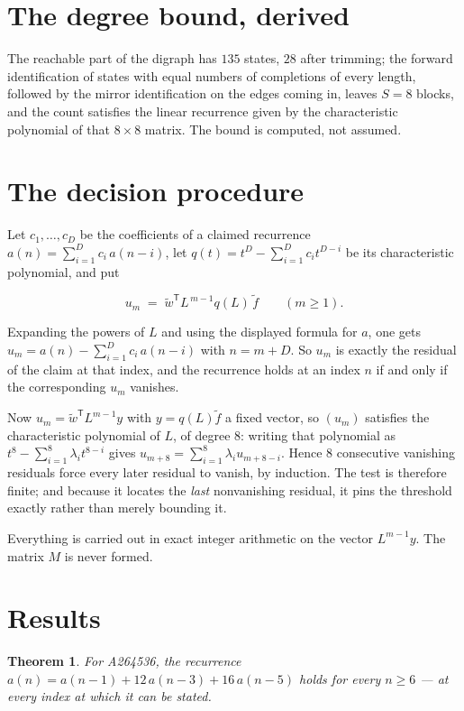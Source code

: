 \documentclass[11pt]{article}
\newtheorem{theorem}{Theorem}
\theoremstyle{definition}
\begin{document}
\section{The degree bound, derived}

The reachable part of the digraph has $135$ states, $28$ after trimming; the forward identification of states with equal numbers of completions of every length, followed by the mirror identification on the edges coming in, leaves $S = 8$ blocks, and the count satisfies the linear recurrence given by the characteristic polynomial of that $8\times8$ matrix. The bound is computed, not assumed.

\section{The decision procedure}

Let $c_1,\dots,c_D$ be the coefficients of a claimed recurrence $a(n) = \sum_{i=1}^{D} c_i\,a(n-i)$, let $q(t) = t^{D} - \sum_{i=1}^{D} c_i t^{D-i}$ be its characteristic polynomial, and put

\[u_m \;=\; \tilde w^{\mathsf T} L^{\,m-1} q(L)\,\tilde f \qquad (m \ge 1).\]

Expanding the powers of $L$ and using the displayed formula for $a$, one gets $u_m = a(n) - \sum_{i=1}^{D} c_i\,a(n-i)$ with $n = m + D$. So $u_m$ is exactly the residual of the claim at that index, and the recurrence holds at an index $n$ if and only if the corresponding $u_m$ vanishes.

Now $u_m = \tilde w^{\mathsf T} L^{m-1} y$ with $y = q(L)\tilde f$ a fixed vector, so $(u_m)$ satisfies the characteristic polynomial of $L$, of degree $8$: writing that polynomial as $t^{8} - \sum_{i=1}^{8} \lambda_i t^{8-i}$ gives $u_{m+8} = \sum_{i=1}^{8} \lambda_i u_{m+8-i}$. Hence $8$ consecutive vanishing residuals force every later residual to vanish, by induction. The test is therefore finite; and because it locates the {\itshape last} nonvanishing residual, it pins the threshold exactly rather than merely bounding it.

Everything is carried out in exact integer arithmetic on the vector $L^{m-1}y$. The matrix $M$ is never formed.

\section{Results}

\begin{theorem} For A264536, the recurrence $a(n) = a(n-1) + 12\,a(n-3) + 16\,a(n-5)$ holds for every $n \ge 6$ --- at every index at which it can be stated.\end{theorem}
\end{document}
